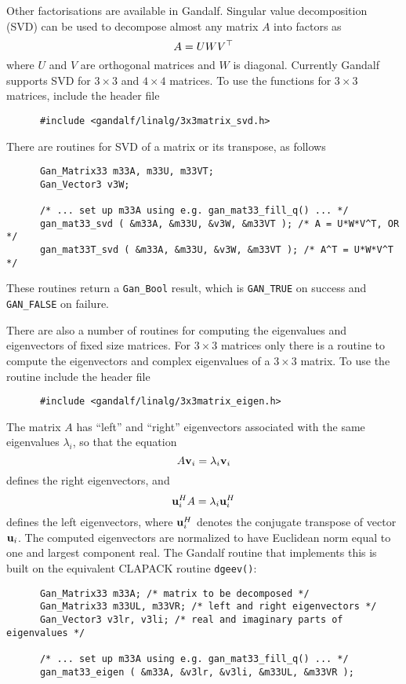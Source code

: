 Other factorisations are available in Gandalf. Singular value decomposition
(SVD) can be used to decompose almost any matrix $A$ into factors as
\[ A = UWV^{\top}
\]
where $U$ and $V$ are orthogonal matrices and $W$ is diagonal.
Currently Gandalf supports SVD for $3\times 3$ and $4\times 4$ matrices.
To use the functions for $3\times 3$ matrices, include the header file
\begin{verbatim}
      #include <gandalf/linalg/3x3matrix_svd.h>
\end{verbatim}
There are routines for SVD of a matrix or its transpose, as follows
\begin{verbatim}
      Gan_Matrix33 m33A, m33U, m33VT;
      Gan_Vector3 v3W;

      /* ... set up m33A using e.g. gan_mat33_fill_q() ... */
      gan_mat33_svd ( &m33A, &m33U, &v3W, &m33VT ); /* A = U*W*V^T, OR */
      gan_mat33T_svd ( &m33A, &m33U, &v3W, &m33VT ); /* A^T = U*W*V^T */
\end{verbatim}
These routines return a {\tt Gan\_Bool} result, which is {\tt GAN\_TRUE}
on success and {\tt GAN\_FALSE} on failure.

There are also a number of routines for computing the eigenvalues and
eigenvectors of fixed size matrices. For $3\times 3$ matrices only there
is a routine to compute the eigenvectors and complex eigenvalues of
a $3\times 3$ matrix. To use the routine include the header file
\begin{verbatim}
      #include <gandalf/linalg/3x3matrix_eigen.h>
\end{verbatim}
The matrix $A$ has ``left'' and ``right'' eigenvectors associated with the
same eigenvalues $\lambda_i$, so that the equation
\[ A {\bf v}_i = \lambda_i {\bf v}_i
\]
defines the right eigenvectors, and
\[ {\bf u}_i^H A = \lambda_i {\bf u}_i^H
\]
defines the left eigenvectors, where ${\bf u}_i^H$ denotes the conjugate
transpose of vector ${\bf u}_i$.
The computed eigenvectors are normalized to have Euclidean norm   
equal to one and largest component real. The Gandalf routine that implements
this is built on the equivalent CLAPACK routine {\tt dgeev()}:
\begin{verbatim}
      Gan_Matrix33 m33A; /* matrix to be decomposed */
      Gan_Matrix33 m33UL, m33VR; /* left and right eigenvectors */
      Gan_Vector3 v3lr, v3li; /* real and imaginary parts of eigenvalues */

      /* ... set up m33A using e.g. gan_mat33_fill_q() ... */
      gan_mat33_eigen ( &m33A, &v3lr, &v3li, &m33UL, &m33VR );
\end{verbatim}

